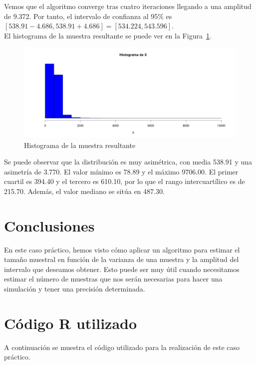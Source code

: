 \documentclass[12pt,a4paper,twoside,openright,titlepage,final]{article}
\begin{document}
Vemos que el algoritmo converge tras cuatro iteraciones llegando a una amplitud de 9.372. Por tanto, el intervalo de confianza al 95\% es $[538.91 - 4.686, 538.91 + 4.686] = [534.224, 543.596]$.\\

El histograma de la muestra resultante se puede ver en la Figura~\ref{fig:histograma}.\\

\begin{figure}[tbph!]
	\centering
	\includegraphics[width=0.8\linewidth]{imagenes/histograma}
	\caption{Histograma de la muestra resultante}
	\label{fig:histograma}
\end{figure}

Se puede observar que la distribución es muy asimétrica, con media 538.91 y una asimetría de 3.770. El valor mínimo es 78.89 y el máximo 9706.00. El primer cuartil es 394.40 y el tercero es 610.10, por lo que el rango intercuartílico es de 215.70. Además, el valor mediano se sitúa en 487.30.  

\section{Conclusiones}

En este caso práctico, hemos visto cómo aplicar un algoritmo para estimar el tamaño muestral en función de la varianza de una muestra y la amplitud del intervalo que deseamos obtener. Esto puede ser muy útil cuando necesitamos estimar el número de muestras que nos serán necesarias para hacer una simulación y tener una precisión determinada.

\newpage

\section{Código R utilizado}

A continuación se muestra el código utilizado para la realización de este caso práctico.

\inputminted{r}{../codigo/caso_iv.R}
\end{document}
